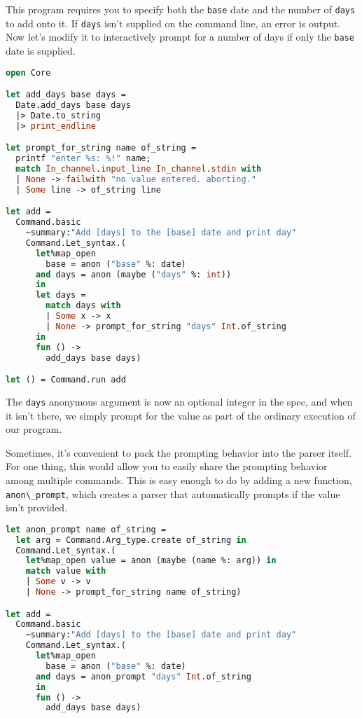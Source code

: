 This program requires you to specify both the
\passthrough{\lstinline!base!} date and the number of
\passthrough{\lstinline!days!} to add onto it. If
\passthrough{\lstinline!days!} isn't supplied on the command line, an
error is output. Now let's modify it to interactively prompt for a
number of days if only the \passthrough{\lstinline!base!} date is
supplied.

\begin{lstlisting}[language=Caml]
open Core

let add_days base days =
  Date.add_days base days
  |> Date.to_string
  |> print_endline

let prompt_for_string name of_string =
  printf "enter %s: %!" name;
  match In_channel.input_line In_channel.stdin with
  | None -> failwith "no value entered. aborting."
  | Some line -> of_string line

let add =
  Command.basic
    ~summary:"Add [days] to the [base] date and print day"
    Command.Let_syntax.(
      let%map_open
        base = anon ("base" %: date)
      and days = anon (maybe ("days" %: int))
      in
      let days =
        match days with
        | Some x -> x
        | None -> prompt_for_string "days" Int.of_string
      in
      fun () ->
        add_days base days)

let () = Command.run add
\end{lstlisting}

The \passthrough{\lstinline!days!} anonymous argument is now an optional
integer in the spec, and when it isn't there, we simply prompt for the
value as part of the ordinary execution of our program.

Sometimes, it's convenient to pack the prompting behavior into the
parser itself. For one thing, this would allow you to easily share the
prompting behavior among multiple commands. This is easy enough to do by
adding a new function, \passthrough{\lstinline!anon\_prompt!}, which
creates a parser that automatically prompts if the value isn't provided.

\begin{lstlisting}[language=Caml]
let anon_prompt name of_string =
  let arg = Command.Arg_type.create of_string in
  Command.Let_syntax.(
    let%map_open value = anon (maybe (name %: arg)) in
    match value with
    | Some v -> v
    | None -> prompt_for_string name of_string)

let add =
  Command.basic
    ~summary:"Add [days] to the [base] date and print day"
    Command.Let_syntax.(
      let%map_open
        base = anon ("base" %: date)
      and days = anon_prompt "days" Int.of_string
      in
      fun () ->
        add_days base days)
\end{lstlisting}

